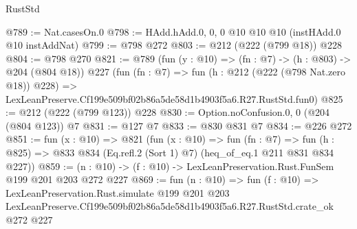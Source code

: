 \begin{lexlean}{RustStd}
\begin{coremodule}
@789 := Nat.casesOn.{0}
@798 := HAdd.hAdd.{0, 0, 0} @10 @10 @10 (instHAdd.{0} @10 instAddNat)
@799 := @798 @272
@803 := @212 (@222 (@799 @18)) @228
@804 := @798 @270
@821 := @789
    (fun (y : @10) => (fn : @7) -> (h : @803) -> @204 (@804 @18))
    @227
    (fun (fn : @7) =>
    fun (h : @212 (@222 (@798 Nat.zero @18)) @228) =>
    LexLeanPreserve.Cf199e509bf02b86a5de58d1b4903f5a6.R27.RustStd.fun0)
@825 := @212 (@222 (@799 @123)) @228
@830 := Option.noConfusion.{0, 0} (@204 (@804 @123)) @7
@831 := @127 @7
@833 := @830 @831 @7
@834 := @226 @272
@851 := fun (x : @10) =>
  @821
    (fun (x : @10) =>
    fun (fn : @7) =>
    fun (h : @825) => @833 @834 (Eq.refl.{2} (Sort 1) @7) (heq_of_eq.{1} @211 @831 @834 @227))
@859 := (n : @10) -> (f : @10) -> LexLeanPreservation.Rust.FunSem @199 @201 @203 @272 @227
@869 := fun (n : @10) =>
  fun (f : @10) =>
  LexLeanPreservation.Rust.simulate
    @199
    @201
    @203
    LexLeanPreserve.Cf199e509bf02b86a5de58d1b4903f5a6.R27.RustStd.crate_ok
    @272
    @227
\end{coremodule}
\end{lexlean}
